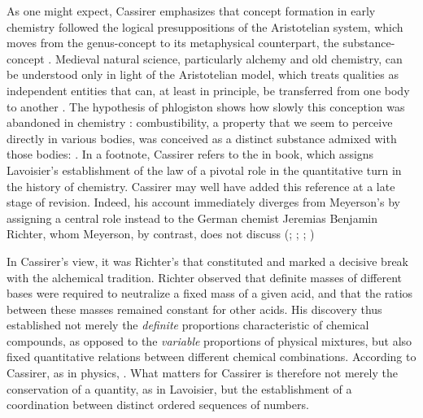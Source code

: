 \documentclass[submitted,12pt]{article}
\begin{document}
As one might expect, Cassirer emphasizes that concept formation in early chemistry followed the logical presuppositions of the Aristotelian system, which moves from the genus-concept  to its metaphysical counterpart, the substance-concept \origg{\SB}. Medieval natural science, particularly alchemy and old chemistry, can be understood only in light of the Aristotelian model, which treats qualities as independent entities that can, at least in principle, be transferred from one body to another . The hypothesis of phlogiston shows how slowly this conception was abandoned in chemistry : combustibility, a property that we seem to perceive directly in various bodies, was conceived as a distinct substance admixed with those bodies:  . In a footnote, Cassirer refers to the  in  book, which assigns Lavoisier's establishment of the law of  a pivotal role in the quantitative turn in the history of chemistry. Cassirer may well have added this reference at a late stage of revision. Indeed, his account immediately diverges from Meyerson's by assigning a central role instead to the German chemist Jeremias Benjamin Richter, whom Meyerson, by contrast, does not discuss (\cite[see][III]{Duhem1902}; \cite[lect.~4]{Ladenburg1902}; \cite[I.I]{Wurtz1879}; \cite[44--49]{Ostwald1906Leitlinien})

 
In Cassirer's view, it was Richter's  that constituted   and marked a decisive break with the alchemical tradition. Richter observed that definite masses of different bases were required to neutralize a fixed mass of a given acid, and that the ratios between these masses remained constant for other acids. His discovery thus established not merely the \emph{definite} proportions characteristic of chemical compounds, as opposed to the \emph{variable} proportions of physical mixtures, but also fixed quantitative relations between different chemical combinations. According to Cassirer, as in physics,  . What matters for Cassirer is therefore not merely the conservation  of a quantity, as in Lavoisier, but the establishment of a coordination  between distinct ordered sequences of numbers.
\end{document}
